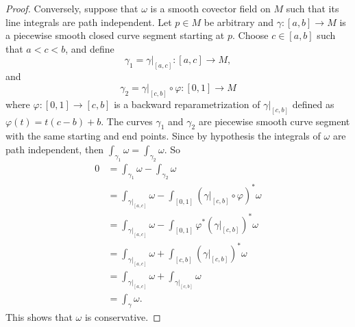 \documentclass[a4paper]{article}
\theoremstyle{remark}
\begin{document}
\begin{proof}
Conversely, suppose that $\omega$ is a smooth covector field on $M$ such that its line integrals are path independent. Let $p \in M$ be arbitrary and $\gamma : [a,b] \to M$ is a piecewise smooth closed curve segment starting at $p$. Choose $c \in [a,b]$ such that $a<c<b$, and define 
$$
\gamma_1 = \gamma|_{[a,c]} : [a,c] \to M,
$$
and
$$
\gamma_2 = \gamma|_{[c,b]} \circ \varphi : [0,1] \to M 
$$
where $\varphi : [0,1] \to [c,b]$ is a backward reparametrization of $\gamma|_{[c,b]}$ defined as $\varphi(t) = t(c-b) + b$. The curves $\gamma_1$ and $\gamma_2$ are piecewise smooth curve segment with the same starting and end points. Since by hypothesis the integrals of $\omega$ are path independent, then $\int_{\gamma_1} \omega = \int_{\gamma_2} \omega$. So
\begin{align*}
0 &= \int_{\gamma_1} \omega - \int_{\gamma_2} \omega\\ &= \int_{\gamma|_{[a,c]}} \omega - \int_{[0,1]} (\gamma|_{[c,b]} \circ \varphi)^*\omega \\ &= \int_{\gamma|_{[a,c]}} \omega - \int_{[0,1]} \varphi^*(\gamma|_{[c,b]})^*\omega \\ &= \int_{\gamma|_{[a,c]}} \omega + \int_{[c,b]} (\gamma|_{[c,b]})^*\omega \\&= \int_{\gamma|_{[a,c]}} \omega + \int_{\gamma|_{[c,b]}} \omega \\&= \int_{\gamma} \omega.
\end{align*}
This shows that $\omega$ is conservative. 
\end{proof}
\end{document}
